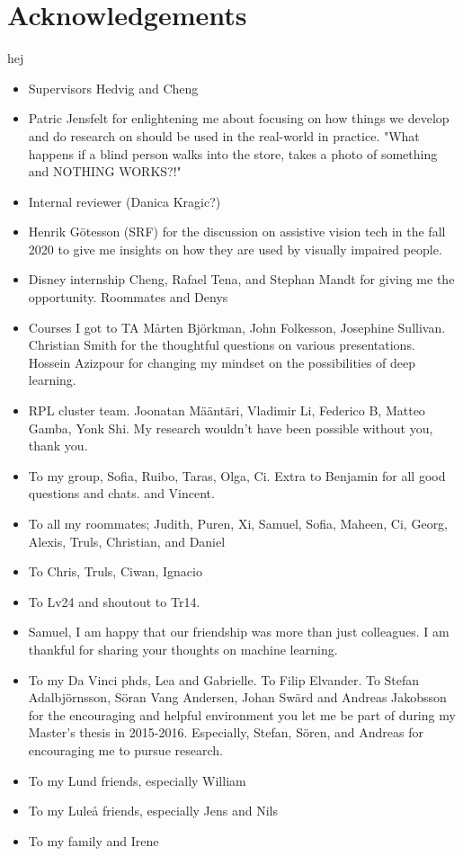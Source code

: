 
\chapter{Acknowledgements}
\label{chap:acknowledgements}

\noindent hej

\begin{itemize}
	\item Supervisors Hedvig and Cheng
	\item Patric Jensfelt for enlightening me about focusing on how things we develop and do research on should be used in the real-world in practice. "What happens if a blind person walks into the store, takes a photo of something and NOTHING WORKS?!"
	\item Internal reviewer (Danica Kragic?)
	\item Henrik Götesson (SRF) for the discussion on assistive vision tech in the fall 2020 to give me insights on how they are used by visually impaired people. 
	\item Disney internship Cheng, Rafael Tena, and Stephan Mandt for giving me the opportunity. Roommates and Denys
	\item Courses I got to TA Mårten Björkman, John Folkesson, Josephine Sullivan. Christian Smith for the thoughtful questions on various presentations. Hossein Azizpour for changing my mindset on the possibilities of deep learning.   
	\item RPL cluster team. Joonatan Määntäri, Vladimir Li, Federico B, Matteo Gamba, Yonk Shi. My research wouldn't have been possible without you, thank you. 
	\item To my group, Sofia, Ruibo, Taras, Olga, Ci. Extra to Benjamin for all good questions and chats. and Vincent. 
	\item To all my roommates; Judith, Puren, Xi, Samuel, Sofia, Maheen, Ci, Georg, Alexis, Truls, Christian, and Daniel
	\item To Chris, Truls, Ciwan, Ignacio
	\item To Lv24 and shoutout to Tr14. 
	\item Samuel, I am happy that our friendship was more than just colleagues. I am thankful for sharing your thoughts on machine learning.  
	\item To my Da Vinci phds, Lea and Gabrielle. To Filip Elvander. To Stefan Adalbjörnsson, Söran Vang Andersen, Johan Swärd and Andreas Jakobsson for the encouraging and helpful environment you let me be part of during my Master's thesis in 2015-2016. Especially, Stefan, Sören, and Andreas for encouraging me to pursue research. 
	\item To my Lund friends, especially William
	\item To my Luleå friends, especially Jens and Nils
	\item To my family and Irene
\end{itemize}
